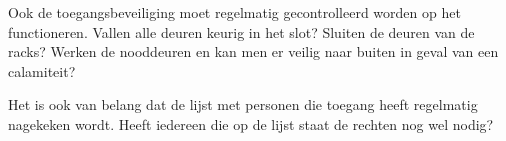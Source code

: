 Ook de toegangsbeveiliging moet regelmatig gecontrolleerd worden op het functioneren. Vallen alle deuren keurig in het slot? Sluiten de deuren van de racks? Werken de nooddeuren en kan men er veilig naar buiten in geval van een calamiteit?

Het is ook van belang dat de lijst met personen die toegang heeft regelmatig nagekeken wordt. Heeft iedereen die op de lijst staat de rechten nog wel nodig?

